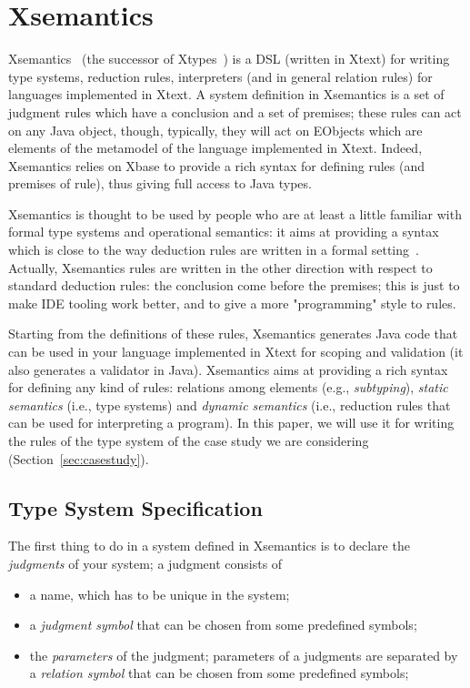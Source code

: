 \section{Xsemantics}
\label{sec:xsemantics}

Xsemantics~\cite{lbts} (the successor of Xtypes~\cite{Bet11}) is a DSL (written
in Xtext) for writing type systems, reduction rules, interpreters (and in
general relation rules) for languages implemented in Xtext.
A system definition in Xsemantics is a set of judgment rules which have a
conclusion and a set of premises; these rules can act on any Java object,
though, typically, they will act on EObjects which are elements of the metamodel
of the language implemented in Xtext.  Indeed, Xsemantics relies on Xbase to
provide a rich syntax for defining rules (and premises of rule), thus giving
full access to Java types.

Xsemantics is thought to be used by people who are at least a little familiar
with formal type systems and operational semantics: it aims at providing
a syntax which is close to the way deduction rules are written in a formal
setting~\cite{hindley:1997a,Pierce02}.
Actually, Xsemantics rules are written in the other direction with respect
to standard deduction rules: the conclusion come before the premises; this is just
to make IDE tooling work better, and to give a more "programming" style to rules.

Starting from the definitions of these rules, Xsemantics generates Java code
that can be used in your language implemented in Xtext for scoping and
validation (it also generates a validator in Java).  Xsemantics aims at
providing a rich syntax for defining any kind of rules: relations among elements
(e.g., \emph{subtyping}), \emph{static semantics} (i.e., type systems) and
\emph{dynamic semantics} (i.e., reduction rules that can be used for
interpreting a program).  In this paper, we will use it for writing the rules of
the type system of the case study we are considering
(Section~\ref{sec:casestudy}).

\subsection{Type System Specification}

The first thing to do in a system defined in Xsemantics is to declare the
\emph{judgments} of your system; a judgment consists of

\begin{itemize}
\item 
a name, which has to be unique in the system;
\item 
a \textit{judgment symbol} that can be chosen from some predefined symbols;
\item 
the \textit{parameters} of the judgment; parameters of a judgments are separated by
	a \textit{relation symbol} that can be chosen from some predefined symbols;
\end{itemize}

